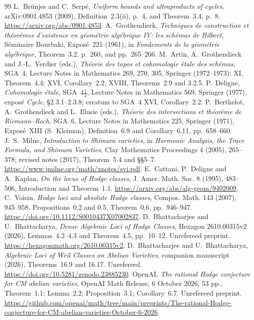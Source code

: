 \begin{thebibliography}{99}
 L.~Br\"unjes and C.~Serp\'e, \emph{Uniform bounds and ultraproducts of cycles}, arXiv:0901.4853 (2009), Definition~2.3(ii), p.~4, and Theorem~3.4, p.~8. \url{https://arxiv.org/abs/0901.4853}.
 A.~Grothendieck, \emph{Techniques de construction et th\'eor\`emes d'existence en g\'eom\'etrie alg\'ebrique IV: les sch\'emas de Hilbert}, S\'eminaire Bourbaki, Expos\'e~221 (1961), in \emph{Fondements de la g\'eom\'etrie alg\'ebrique}, Theorem~3.2, p.~260, and pp.~265--266.
 M.~Artin, A.~Grothendieck and J.-L.~Verdier (eds.), \emph{Th\'eorie des topos et cohomologie \'etale des sch\'emas}, SGA~4, Lecture Notes in Mathematics 269, 270, 305, Springer (1972--1973): XI, Theorem~4.4; XVI, Corollary~2.2; XVIII, Theorems~2.9 and 3.2.5.
 P.~Deligne, \emph{Cohomologie \'etale}, SGA~$4\frac12$, Lecture Notes in Mathematics 569, Springer (1977), expos\'e \emph{Cycle}, \S2.3.1--2.3.8; erratum to SGA~4 XVI, Corollary~2.2.
 P.~Berthelot, A.~Grothendieck and L.~Illusie (eds.), \emph{Th\'eorie des intersections et th\'eor\`eme de Riemann--Roch}, SGA~6, Lecture Notes in Mathematics 225, Springer (1971), Expos\'e~XIII (S.~Kleiman), Definition~6.9 and Corollary~6.11, pp.~658--660.
 J.~S.~Milne, \emph{Introduction to Shimura varieties}, in \emph{Harmonic Analysis, the Trace Formula, and Shimura Varieties}, Clay Mathematics Proceedings 4 (2005), 265--378; revised notes (2017), Theorem~5.4 and \S\S5--7. \url{https://www.jmilne.org/math/xnotes/svi.pdf}.
 E.~Cattani, P.~Deligne and A.~Kaplan, \emph{On the locus of Hodge classes}, J. Amer. Math. Soc. 8 (1995), 483--506, Introduction and Theorem~1.1. \url{https://arxiv.org/abs/alg-geom/9402009}.
 C.~Voisin, \emph{Hodge loci and absolute Hodge classes}, Compos. Math. 143 (2007), 945--958, Propositions~0.2 and 0.5, Theorem~0.6, pp.~946--947. \url{https://doi.org/10.1112/S0010437X07002837}.
 D.~Bhattacharjee and U.~Bhattacharya, \emph{Dense Algebraic Loci of Hodge Classes}, Hexagon 2610.00315v2 (2026), Lemmas~4.2--4.3 and Theorem~4.5, pp.~10--12. Unrefereed preprint. \url{https://hexagonmath.org/2610.00315v2}.
 D.~Bhattacharjee and U.~Bhattacharya, \emph{Algebraic Loci of Weil Classes on Abelian Varieties}, companion manuscript (2026), Theorems~16.9 and 16.17. Unrefereed. \url{https://doi.org/10.5281/zenodo.23885230}.
 OpenAI, \emph{The rational Hodge conjecture for CM abelian varieties}, OpenAI Math Release, 6 October 2026, 53 pp., Theorem~1.1; Lemma~2.2; Proposition~3.1; Corollary~6.7. Unrefereed preprint. \url{https://github.com/openai/math/tree/main/preprints/The-rational-Hodge-conjecture-for-CM-abelian-varieties-October-6-2026}.

\end{thebibliography}
